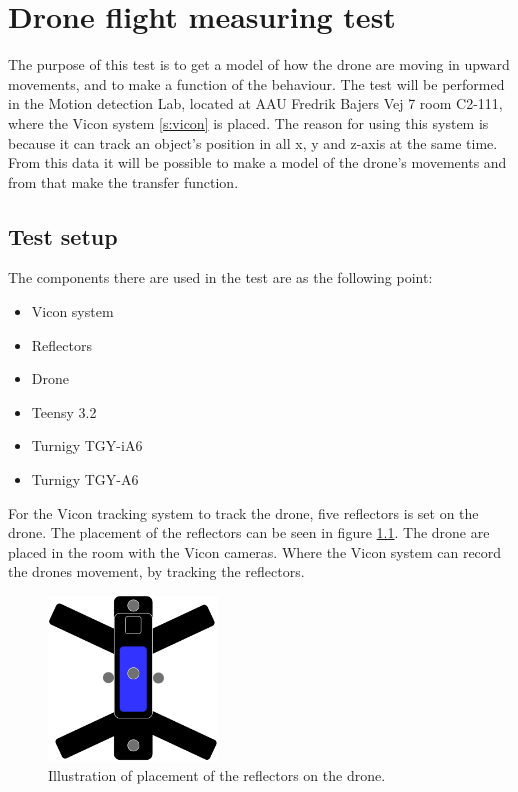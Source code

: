 \chapter{Drone flight measuring test}\label{ap:drone_flight_test}
The purpose of this test is to get a model of how the drone are moving in upward movements, and to make a function of the behaviour. The test will be performed in the Motion detection Lab, located at AAU Fredrik Bajers Vej 7 room C2-111, where the Vicon system \ref{s:vicon} is placed. The reason for using this system is because it can track an object's position in all x, y and z-axis at the same time. From this data it will be possible to make a model of the drone's movements and from that make the transfer function.

\section*{Test setup}
The components there are used in the test are as the following point:
\begin{itemize}
    \item{Vicon system}
    \item{Reflectors}
    \item{Drone}
    \item{Teensy 3.2} %
    \item{Turnigy TGY-iA6} %
    \item{Turnigy TGY-A6} %
\end{itemize}
For the Vicon tracking system to track the drone, five reflectors is set on the drone. The placement of the reflectors can be seen in figure \ref{fig:reflectors}.
The drone are placed in the room with the Vicon cameras. Where the Vicon system can record the drones movement, by tracking the reflectors. 

\begin{figure}[H]
    \centering
    \includegraphics[width=0.4\textwidth]{figures/Appendix/measuringTest/Reflector1.pdf}
    \caption{Illustration of placement of the reflectors on the drone.}
    \label{fig:reflectors}
\end{figure}


